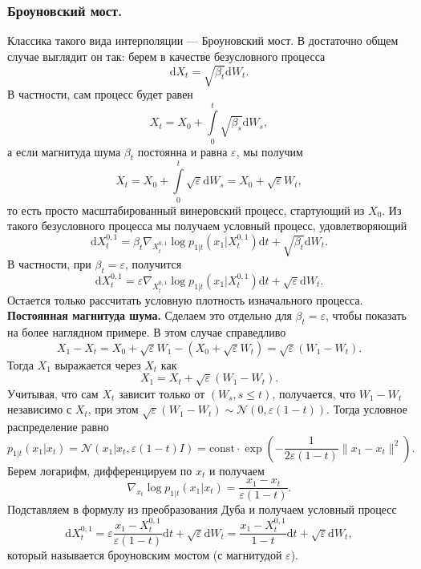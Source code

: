 \documentclass[12pt]{article}
\theoremstyle{definition}
\begin{document}
\subsubsection{Броуновский мост.}
Классика такого вида интерполяции --- Броуновский мост. В достаточно общем случае выглядит он так: берем в качестве безусловного процесса 
\[
    \mathrm{d} X_t = \sqrt{\beta_t} \mathrm{d} W_t.
\]
В частности, сам процесс будет равен
\[
    X_t = X_0 + \int\limits_{0}^{t} \sqrt{\beta_s}\mathrm{d} W_s,
\]
а если магнитуда шума $\beta_t$ постоянна и равна $\varepsilon$, мы получим
\[
    X_t = X_0 + \int\limits_{0}^{t} \sqrt{\varepsilon}\mathrm{d} W_s = X_0 + \sqrt{\varepsilon} W_t,
\]
то есть просто масштабированный винеровский процесс, стартующий из $X_0$.
Из такого безусловного процесса мы получаем условный процесс, удовлетворяющий
\[
    \mathrm{d} X_t^{0, 1} = \beta_t \nabla_{X_t^{0, 1}} \log p_{1|t}(x_1 | X_t^{0, 1}) \mathrm{d} t + \sqrt{\beta_t}\mathrm{d} W_t.
\]
В частности, при $\beta_t = \varepsilon$, получится
\[
    \mathrm{d} X_t^{0, 1} = \varepsilon \nabla_{X_t^{0, 1}} \log p_{1|t}(x_1 | X_t^{0, 1}) \mathrm{d} t + \sqrt{\varepsilon}\mathrm{d} W_t.
\]
Остается только рассчитать условную плотность изначального процесса. \\

\noindent\textbf{Постоянная магнитуда шума.} Сделаем это отдельно для $\beta_t = \varepsilon$, чтобы показать на более наглядном примере. В этом случае справедливо
\[
    X_1 - X_t = X_0 + \sqrt{\varepsilon} W_1 - (X_0 + \sqrt{\varepsilon} W_t) = \sqrt{\varepsilon} (W_1 - W_t).
\]
Тогда $X_1$ выражается через $X_t$ как
\[
    X_1 = X_t + \sqrt{\varepsilon} (W_1 - W_t).
\]
Учитывая, что сам $X_t$ зависит только от $(W_s, s \leq t)$, получается, что $W_1 - W_t$ независимо с $X_t$, при этом $\sqrt{\varepsilon}(W_1 - W_t) \sim \mathcal{N}(0, \varepsilon(1 - t))$. Тогда условное распределение равно
\[
    p_{1 | t}(x_1 | x_t) = \mathcal{N}(x_1 | x_t, \varepsilon (1 - t) I) = \text{const} \cdot \exp\left(-\frac{1}{2 \varepsilon (1 - t)} \| x_1 - x_t \|^2 \right).
\]
Берем логарифм, дифференцируем по $x_t$ и получаем
\[
    \nabla_{x_t} \log p_{1 | t}(x_1 | x_t) = \frac{x_1 - x_t}{\varepsilon (1 - t)}.
\]
Подставляем в формулу из преобразования Дуба и получаем условный процесс
\[
    \mathrm{d} X_t^{0, 1} = \varepsilon \frac{x_1 - X_t^{0, 1}}{\varepsilon(1 - t)} \mathrm{d} t + \sqrt{\varepsilon} \mathrm{d} W_t = \frac{x_1 - X_t^{0, 1}}{1 - t} \mathrm{d} t + \sqrt{\varepsilon} \mathrm{d} W_t,
\]
который называется броуновским мостом (с магнитудой $\varepsilon$).\\
\end{document}

